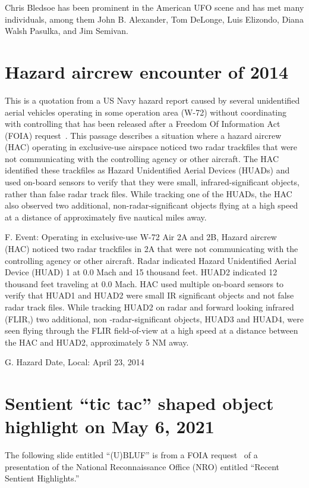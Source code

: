 Chris Bledsoe has been prominent in the American UFO scene and has met many individuals, among them
John B. Alexander,
Tom DeLonge,
Luis Elizondo,
Diana Walsh Pasulka, and
Jim Semivan.




\section{Hazard aircrew encounter of 2014}

This is a quotation from a US Navy hazard report caused by several unidentified aerial vehicles operating in some operation area (W-72)
without coordinating with controlling that has been released after a Freedom Of Information Act (FOIA) request~\cite{Hazard-2014-navi-foia}.
This passage describes a situation where a hazard aircrew (HAC) operating in exclusive-use airspace noticed
two radar trackfiles that were not communicating with the controlling agency or other aircraft.
The HAC identified these trackfiles as Hazard Unidentified Aerial Devices (HUADs)
and used on-board sensors to verify that they were small, infrared-significant objects,
rather than false radar track files. While tracking one of the HUADs,
the HAC also observed two additional, non-radar-significant objects flying at a high speed at a distance of approximately five nautical miles away.


\begin{svgraybox}
\noindent F. Event:
Operating in exclusive-use W-72 Air 2A and 2B, Hazard aircrew (HAC) noticed two radar trackfiles
in 2A that were not communicating with the controlling agency or other aircraft. Radar indicated Hazard
Unidentified Aerial Device (HUAD) 1 at 0.0 Mach and 15 thousand feet. HUAD2 indicated 12 thousand feet
traveling at 0.0 Mach. HAC used multiple on-board sensors to verify that HUAD1 and HUAD2 were small IR
significant objects and not false radar track files. While tracking HUAD2 on radar and forward looking
infrared (FLIR,) two additional, non -radar-significant objects, HUAD3 and HUAD4, were seen flying through
the FLIR field-of-view at a high speed at a distance between the HAC and HUAD2, approximately 5 NM
away.

\noindent G. Hazard Date, Local: April 23, 2014
\end{svgraybox}

\section{Sentient ``tic tac'' shaped object highlight on  May 6, 2021}
The following slide entitled ``(U)BLUF'' is from a FOIA request~\cite{NRO2021May} of a presentation of the National Reconnaissance Office (NRO)
entitled ``Recent Sentient Highlights.''

